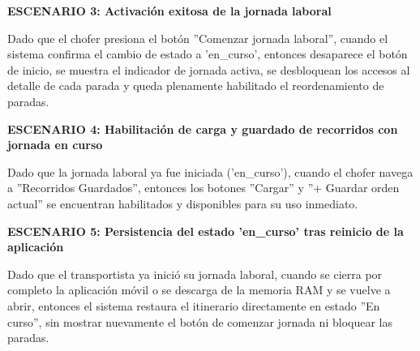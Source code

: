 \documentclass[a4paper,9pt]{article}
\begin{document}
\begin{tcolorbox}
{\noindent\textbf{\textcolor{secondarydark}{ESCENARIO 3:  Activación exitosa de la jornada laboral}}\par\vspace{1pt}
Dado que el chofer presiona el botón ''Comenzar jornada laboral'', cuando el sistema confirma el cambio de estado a 'en\_curso', entonces desaparece el botón de inicio, se muestra el indicador de jornada activa, se desbloquean los accesos al detalle de cada parada y queda plenamente habilitado el reordenamiento de paradas.\par\vspace{2.5pt}
\noindent\textbf{\textcolor{secondarydark}{ESCENARIO 4:  Habilitación de carga y guardado de recorridos con jornada en curso}}\par\vspace{1pt}
Dado que la jornada laboral ya fue iniciada ('en\_curso'), cuando el chofer navega a ''Recorridos Guardados'', entonces los botones ''Cargar'' y ''+ Guardar orden actual'' se encuentran habilitados y disponibles para su uso inmediato.\par\vspace{2.5pt}
\noindent\textbf{\textcolor{secondarydark}{ESCENARIO 5:  Persistencia del estado 'en\_curso' tras reinicio de la aplicación}}\par\vspace{1pt}
Dado que el transportista ya inició su jornada laboral, cuando se cierra por completo la aplicación móvil o se descarga de la memoria RAM y se vuelve a abrir, entonces el sistema restaura el itinerario directamente en estado ''En curso'', sin mostrar nuevamente el botón de comenzar jornada ni bloquear las paradas.\par\vspace{2.5pt}
}\par
\end{tcolorbox}
\end{document}
